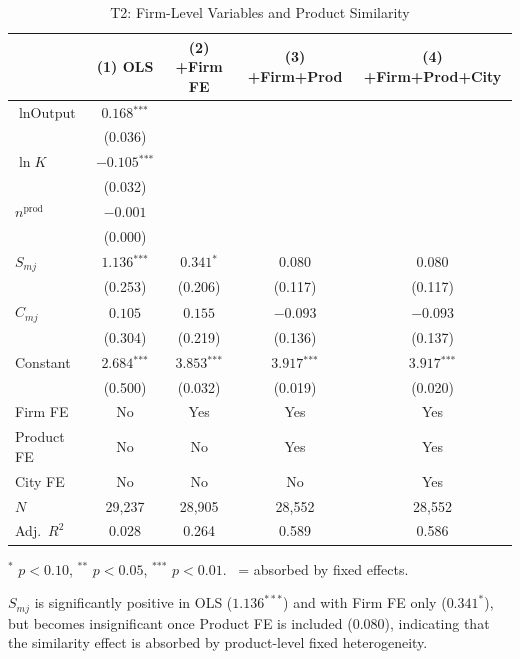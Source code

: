 \documentclass[12pt]{article}
\newcommand{\sym}[1]{\ensuremath{^{\text{#1}}}}
\newcommand{\se}[1]{{\small(#1)}}
\newcommand{\abs}{\textemdash}
\begin{document}
\begin{table}[H]
  \centering
  \caption{T2: Firm-Level Variables and Product Similarity}
  \label{tab:t2}
  \begin{threeparttable}
    \begin{tabular}{lcccc}
      \toprule
      & (1) OLS & (2) +Firm FE & (3) +Firm+Prod & (4) +Firm+Prod+City \\
      \midrule
      \(\ln \text{Output}\) & \(0.168\sym{***}\) & \abs & \abs & \abs \\
                             & \se{0.036} & & & \\[4pt]
      \(\ln K\) & \(-0.105\sym{***}\) & \abs & \abs & \abs \\
                & \se{0.032} & & & \\[4pt]
      \(n^{\text{prod}}\) & \(-0.001\) & \abs & \abs & \abs \\
                          & \se{0.000} & & & \\[4pt]
      \(S_{mj}\) & \(1.136\sym{***}\) & \(0.341\sym{*}\) & \(0.080\) & \(0.080\) \\
                 & \se{0.253} & \se{0.206} & \se{0.117} & \se{0.117} \\[4pt]
      \(C_{mj}\) & \(0.105\) & \(0.155\) & \(-0.093\) & \(-0.093\) \\
                 & \se{0.304} & \se{0.219} & \se{0.136} & \se{0.137} \\[4pt]
      Constant & \(2.684\sym{***}\) & \(3.853\sym{***}\) & \(3.917\sym{***}\) & \(3.917\sym{***}\) \\
               & \se{0.500} & \se{0.032} & \se{0.019} & \se{0.020} \\
      \midrule
      Firm FE    & No  & Yes & Yes & Yes \\
      Product FE & No  & No  & Yes & Yes \\
      City FE    & No  & No  & No  & Yes \\
      \(N\)      & 29,237 & 28,905 & 28,552 & 28,552 \\
      Adj.\ \(R^2\) & 0.028 & 0.264 & 0.589 & 0.586 \\
      \bottomrule
    \end{tabular}
    \begin{tablenotes}[flushleft]
      \footnotesize
      \item \sym{*} \(p<0.10\), \sym{**} \(p<0.05\), \sym{***} \(p<0.01\).
        \abs\ = absorbed by fixed effects.
      \item \(S_{mj}\) is significantly positive in OLS (\(1.136^{***}\)) and
        with Firm FE only (\(0.341^{*}\)), but becomes insignificant once
        Product FE is included (\(0.080\)), indicating that the similarity
        effect is absorbed by product-level fixed heterogeneity.
    \end{tablenotes}
  \end{threeparttable}
\end{table}
\end{document}
